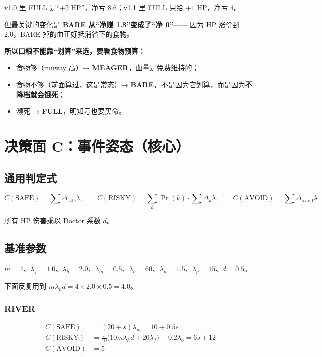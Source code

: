 \documentclass[UTF8,11pt,a4paper]{ctexart}
\begin{document}
\begin{keybox}[title={与 v1.0 相反的结论}]
v1.0 里 FULL 是“$+2$ HP”，净亏 8.6；v1.1 里 FULL 只给 $+1$ HP，净亏 4。

但最关键的变化是 \textbf{BARE 从“净赚 1.8”变成了“净 0”}——
因为 HP 涨价到 2.0，BARE 掉的血正好抵消省下的食物。

\textbf{所以口粮不能靠“划算”来选，要看食物预算：}
\begin{itemize}[leftmargin=1.4em]
  \item 食物够（runway 高）→ \textbf{MEAGER}，血量是免费维持的；
  \item 食物不够（前面算过，这是常态）→ \textbf{BARE}，不是因为它划算，而是因为\textbf{不降档就会饿死}；
  \item 濒死 → \textbf{FULL}，明知亏也要买命。
\end{itemize}
\end{keybox}

\section{决策面 C：事件姿态（核心）}\label{sec:events}

\subsection{通用判定式}

\[
C(\text{SAFE})=\sum \Delta_{\text{safe}}\lambda,\qquad
C(\text{RISKY})=\sum_k \Pr(k)\cdot\sum\Delta_k\lambda,\qquad
C(\text{AVOID})=\sum\Delta_{\text{avoid}}\lambda
\]

所有 HP 伤害乘以 Doctor 系数 $d$。

\subsection{基准参数}

$m=4$、$\lambda_f=1.0$、$\lambda_h=2.0$、$\lambda_m=0.5$、$\lambda_o=60$、$\lambda_a=1.5$、$\lambda_p=15$、$d=0.5$。

\noindent 下面反复用到 $m\lambda_h d=4\times2.0\times0.5=4.0$。

\subsubsection*{RIVER}

\begin{align*}
C(\text{SAFE})&=(20+s)\lambda_m=10+0.5s\\
C(\text{RISKY})&=\tfrac{s}{10}\big(10m\lambda_h d+20\lambda_f\big)+0.2\lambda_o=6s+12\\
C(\text{AVOID})&=5
\end{align*}
\end{document}
